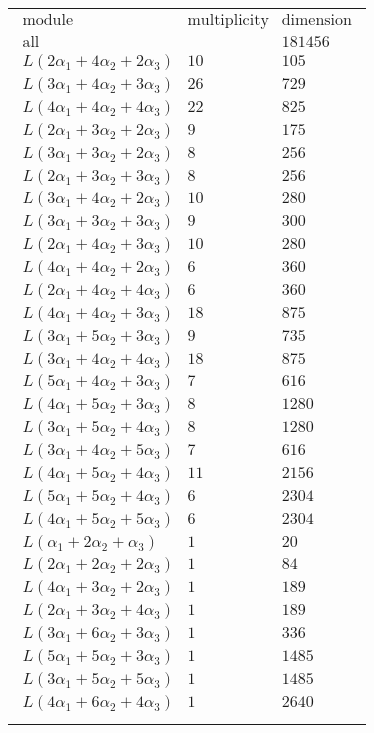 \documentclass[crop,border=2mm]{standalone}
\begin{document}
\begin{tabular}{l}
$\displaystyle
\begin{array}{rll}
	\text{module}&\text{multiplicity}&\text{dimension} \\ \hline \text{all}&&181456 \\
	L\left( 2\alpha_{1}+ 4\alpha_{2}+ 2\alpha_{3}\right)&10&105\\
	L\left( 3\alpha_{1}+ 4\alpha_{2}+ 3\alpha_{3}\right)&26&729\\
	L\left( 4\alpha_{1}+ 4\alpha_{2}+ 4\alpha_{3}\right)&22&825\\
	L\left( 2\alpha_{1}+ 3\alpha_{2}+ 2\alpha_{3}\right)&9&175\\
	L\left( 3\alpha_{1}+ 3\alpha_{2}+ 2\alpha_{3}\right)&8&256\\
	L\left( 2\alpha_{1}+ 3\alpha_{2}+ 3\alpha_{3}\right)&8&256\\
	L\left( 3\alpha_{1}+ 4\alpha_{2}+ 2\alpha_{3}\right)&10&280\\
	L\left( 3\alpha_{1}+ 3\alpha_{2}+ 3\alpha_{3}\right)&9&300\\
	L\left( 2\alpha_{1}+ 4\alpha_{2}+ 3\alpha_{3}\right)&10&280\\
	L\left( 4\alpha_{1}+ 4\alpha_{2}+ 2\alpha_{3}\right)&6&360\\
	L\left( 2\alpha_{1}+ 4\alpha_{2}+ 4\alpha_{3}\right)&6&360\\
	L\left( 4\alpha_{1}+ 4\alpha_{2}+ 3\alpha_{3}\right)&18&875\\
	L\left( 3\alpha_{1}+ 5\alpha_{2}+ 3\alpha_{3}\right)&9&735\\
	L\left( 3\alpha_{1}+ 4\alpha_{2}+ 4\alpha_{3}\right)&18&875\\
	L\left( 5\alpha_{1}+ 4\alpha_{2}+ 3\alpha_{3}\right)&7&616\\
	L\left( 4\alpha_{1}+ 5\alpha_{2}+ 3\alpha_{3}\right)&8&1280\\
	L\left( 3\alpha_{1}+ 5\alpha_{2}+ 4\alpha_{3}\right)&8&1280\\
	L\left( 3\alpha_{1}+ 4\alpha_{2}+ 5\alpha_{3}\right)&7&616\\
	L\left( 4\alpha_{1}+ 5\alpha_{2}+ 4\alpha_{3}\right)&11&2156\\
	L\left( 5\alpha_{1}+ 5\alpha_{2}+ 4\alpha_{3}\right)&6&2304\\
	L\left( 4\alpha_{1}+ 5\alpha_{2}+ 5\alpha_{3}\right)&6&2304\\
	L\left(\alpha_{1}+ 2\alpha_{2}+\alpha_{3}\right)&1&20\\
	L\left( 2\alpha_{1}+ 2\alpha_{2}+ 2\alpha_{3}\right)&1&84\\
	L\left( 4\alpha_{1}+ 3\alpha_{2}+ 2\alpha_{3}\right)&1&189\\
	L\left( 2\alpha_{1}+ 3\alpha_{2}+ 4\alpha_{3}\right)&1&189\\
	L\left( 3\alpha_{1}+ 6\alpha_{2}+ 3\alpha_{3}\right)&1&336\\
	L\left( 5\alpha_{1}+ 5\alpha_{2}+ 3\alpha_{3}\right)&1&1485\\
	L\left( 3\alpha_{1}+ 5\alpha_{2}+ 5\alpha_{3}\right)&1&1485\\
	L\left( 4\alpha_{1}+ 6\alpha_{2}+ 4\alpha_{3}\right)&1&2640
\end{array}
$ \\ \\

\end{tabular}
\end{document}
